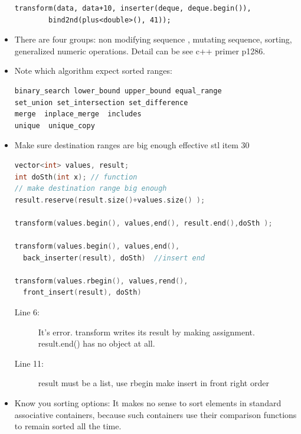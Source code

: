 \documentclass[a4paper,11pt,twoside]{book}
\begin{document}
\begin{itemize}
\begin{lstlisting}[numbers=none]
transform(data, data+10, inserter(deque, deque.begin()),
        bind2nd(plus<double>(), 41));
\end{lstlisting}

\item There are four groups: non modifying sequence , mutating sequence, sorting, generalized numeric operations. Detail can be see c++ primer p1286.

\item Note which algorithm expect sorted ranges:
\begin{lstlisting}[numbers=none]
binary_search lower_bound upper_bound equal_range
set_union set_intersection set_difference
merge  inplace_merge  includes
unique  unique_copy
\end{lstlisting}



\item Make sure destination ranges are big enough effective stl item 30
\begin{lstlisting}[frame=single, language=c++]
vector<int> values, result;
int doSth(int x); // function
// make destination range big enough
result.reserve(result.size()+values.size() );

transform(values.begin(), values,end(), result.end(),doSth );

transform(values.begin(), values,end(),
  back_inserter(result), doSth)  //insert end

transform(values.rbegin(), values,rend(),
  front_insert(result), doSth)
\end{lstlisting}
\begin{description}
	\item[Line 6:] It's error. transform writes its result by making assignment. result.end() has no object at all.
	\item[Line 11:]  result must be a list, use rbegin make insert in front right order
\end{description}



\item Know you sorting options: It makes no sense to sort elements in standard associative containers, because such containers use their comparison functions to remain sorted all the time.


\end{itemize}
\end{document}
